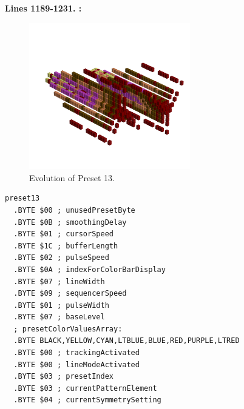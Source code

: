 \textbf{Lines 1189-1231. :} 
\clearpage
\vspace*{-0.5cm}
\begin{minipage}[b]{0.48\linewidth}


                                                                 
\begin{figure}[H]                                                          
  \centering                                                             
  \begin{adjustbox}{width=7cm,center}                                   
  \includegraphics[width=7cm]{src/presets/pattern13-45.png}%
  \end{adjustbox}                                                        
\caption{Evolution of Preset 13.}                                           
\end{figure}                                                               
                                                                 
                                                                           
\end{minipage}
\hspace{0.1cm}
\begin{minipage}[b]{0.48\linewidth}                                       
\begin{lstlisting}[basicstyle=\ttfamily\scriptsize,caption=Data structure for Preset 13.]
preset13
  .BYTE $00 ; unusedPresetByte
  .BYTE $0B ; smoothingDelay
  .BYTE $01 ; cursorSpeed
  .BYTE $1C ; bufferLength
  .BYTE $02 ; pulseSpeed
  .BYTE $0A ; indexForColorBarDisplay
  .BYTE $07 ; lineWidth
  .BYTE $09 ; sequencerSpeed
  .BYTE $01 ; pulseWidth
  .BYTE $07 ; baseLevel
  ; presetColorValuesArray: 
  .BYTE BLACK,YELLOW,CYAN,LTBLUE,BLUE,RED,PURPLE,LTRED
  .BYTE $00 ; trackingActivated
  .BYTE $00 ; lineModeActivated
  .BYTE $03 ; presetIndex
  .BYTE $03 ; currentPatternElement
  .BYTE $04 ; currentSymmetrySetting
\end{lstlisting}
\end{minipage}

